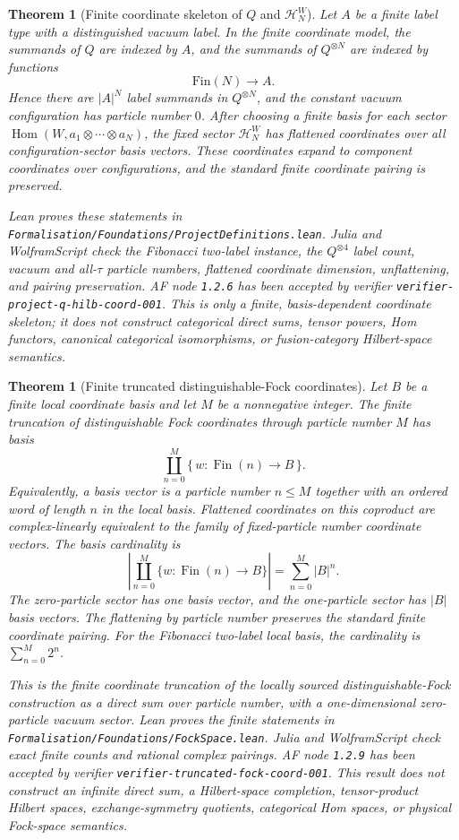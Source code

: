 \documentclass[11pt]{article}
\newtheorem{theorem}[definition]{Theorem}
\DeclareMathOperator{\Hom}{Hom}
\begin{document}
\begin{theorem}[Finite coordinate skeleton of \(Q\) and \(\mathcal H_N^W\)]
Let \(A\) be a finite label type with a distinguished vacuum label. In the
finite coordinate model, the summands of \(Q\) are indexed by \(A\), and the
summands of \(Q^{\otimes N}\) are indexed by functions
\[
\mathrm{Fin}(N)\to A.
\]
Hence there are \(|A|^N\) label summands in \(Q^{\otimes N}\), and the constant
vacuum configuration has particle number \(0\). After choosing a finite basis
for each sector \(\Hom(W,a_1\otimes\cdots\otimes a_N)\), the fixed sector
\(\mathcal H_N^W\) has flattened coordinates over all configuration-sector
basis vectors. These coordinates expand to component coordinates over
configurations, and the standard finite coordinate pairing is preserved.

Lean proves these statements in
\texttt{Formalisation/Foundations/ProjectDefinitions.lean}. Julia and
WolframScript check the Fibonacci two-label instance, the \(Q^{\otimes 4}\)
label count, vacuum and all-\(\tau\) particle numbers, flattened coordinate
dimension, unflattening, and pairing preservation. AF node \texttt{1.2.6} has
been accepted by verifier \texttt{verifier-project-q-hilb-coord-001}. This is
only a finite, basis-dependent coordinate skeleton; it does not construct
categorical direct sums, tensor powers, Hom functors, canonical categorical
isomorphisms, or fusion-category Hilbert-space semantics.
\end{theorem}

\begin{theorem}[Finite truncated distinguishable-Fock coordinates]
Let \(B\) be a finite local coordinate basis and let \(M\) be a nonnegative
integer. The finite truncation of distinguishable Fock coordinates through
particle number \(M\) has basis
\[
\coprod_{n=0}^{M}\{\,w:\operatorname{Fin}(n)\to B\,\}.
\]
Equivalently, a basis vector is a particle number \(n\le M\) together with an
ordered word of length \(n\) in the local basis. Flattened coordinates on this
coproduct are complex-linearly equivalent to the family of fixed-particle
number coordinate vectors. The basis cardinality is
\[
\left|\coprod_{n=0}^{M}\{w:\operatorname{Fin}(n)\to B\}\right|
=\sum_{n=0}^{M}|B|^n.
\]
The zero-particle sector has one basis vector, and the one-particle sector has
\(|B|\) basis vectors. The flattening by particle number preserves the
standard finite coordinate pairing. For the Fibonacci two-label local basis,
the cardinality is \(\sum_{n=0}^{M}2^n\).

This is the finite coordinate truncation of the locally sourced
distinguishable-Fock construction as a direct sum over particle number, with a
one-dimensional zero-particle vacuum sector. Lean proves the finite statements
in \texttt{Formalisation/Foundations/FockSpace.lean}. Julia and WolframScript
check exact finite counts and rational complex pairings. AF node
\texttt{1.2.9} has been accepted by verifier
\texttt{verifier-truncated-fock-coord-001}. This result does not construct an
infinite direct sum, a Hilbert-space completion, tensor-product Hilbert
spaces, exchange-symmetry quotients, categorical Hom spaces, or physical
Fock-space semantics.
\end{theorem}
\end{document}
